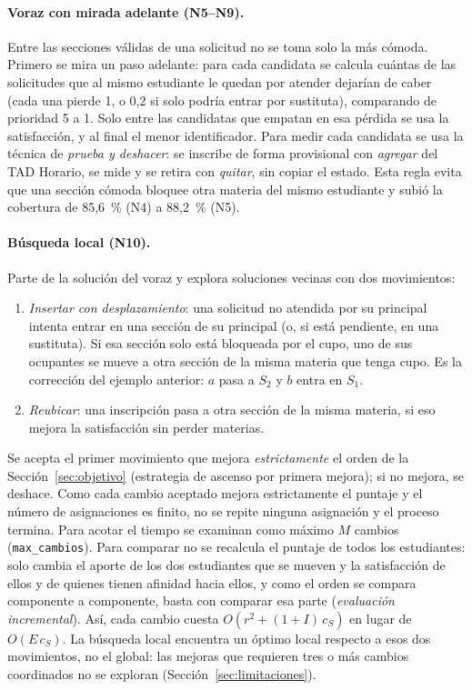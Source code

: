 \paragraph{Voraz con mirada adelante (N5--N9).} Entre las secciones válidas de una solicitud no se toma solo la más cómoda. Primero se mira un paso adelante: para cada candidata se calcula cuántas de las solicitudes que al mismo estudiante le quedan por atender dejarían de caber (cada una pierde 1, o 0,2 si solo podría entrar por sustituta), comparando de prioridad 5 a 1. Solo entre las candidatas que empatan en esa pérdida se usa la satisfacción, y al final el menor identificador. Para medir cada candidata se usa la técnica de \emph{prueba y deshacer}: se inscribe de forma provisional con \emph{agregar} del TAD Horario, se mide y se retira con \emph{quitar}, sin copiar el estado. Esta regla evita que una sección cómoda bloquee otra materia del mismo estudiante y subió la cobertura de 85,6~\% (N4) a 88,2~\% (N5).

\paragraph{Búsqueda local (N10).} Parte de la solución del voraz y explora soluciones vecinas con dos movimientos:
\begin{enumerate}
\item \emph{Insertar con desplazamiento}: una solicitud no atendida por su principal intenta entrar en una sección de su principal (o, si está pendiente, en una sustituta). Si esa sección solo está bloqueada por el cupo, uno de sus ocupantes se mueve a otra sección de la misma materia que tenga cupo. Es la corrección del ejemplo anterior: $a$ pasa a $S_2$ y $b$ entra en $S_1$.
\item \emph{Reubicar}: una inscripción pasa a otra sección de la misma materia, si eso mejora la satisfacción sin perder materias.
\end{enumerate}
Se acepta el primer movimiento que mejora \emph{estrictamente} el orden de la Sección~\ref{sec:objetivo} (estrategia de ascenso por primera mejora); si no mejora, se deshace. Como cada cambio aceptado mejora estrictamente el puntaje y el número de asignaciones es finito, no se repite ninguna asignación y el proceso termina. Para acotar el tiempo se examinan como máximo $M$ cambios (\texttt{max\_cambios}). Para comparar no se recalcula el puntaje de todos los estudiantes: solo cambia el aporte de los dos estudiantes que se mueven y la satisfacción de ellos y de quienes tienen afinidad hacia ellos, y como el orden se compara componente a componente, basta con comparar esa parte (\emph{evaluación incremental}). Así, cada cambio cuesta $O(r^2 + (1+I)\,c_S)$ en lugar de $O(E\,c_S)$. La búsqueda local encuentra un óptimo local respecto a esos dos movimientos, no el global: las mejoras que requieren tres o más cambios coordinados no se exploran (Sección~\ref{sec:limitaciones}).

